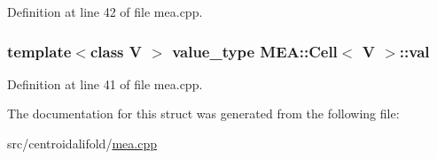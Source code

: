 Definition at line 42 of file mea.\+cpp.

\hypertarget{struct_m_e_a_1_1_cell_a2561f0900802700778a51698ba33ee57}{
\subsubsection[{val}]{\setlength{\rightskip}{0pt plus 5cm}template$<$class V $>$ {\bf value\+\_\+type} {\bf M\+E\+A\+::\+Cell}$<$ V $>$\+::val}}\label{struct_m_e_a_1_1_cell_a2561f0900802700778a51698ba33ee57}


Definition at line 41 of file mea.\+cpp.



The documentation for this struct was generated from the following file\+:\begin{DoxyCompactItemize}
\item 
src/centroidalifold/\hyperlink{mea_8cpp}{mea.\+cpp}\end{DoxyCompactItemize}
